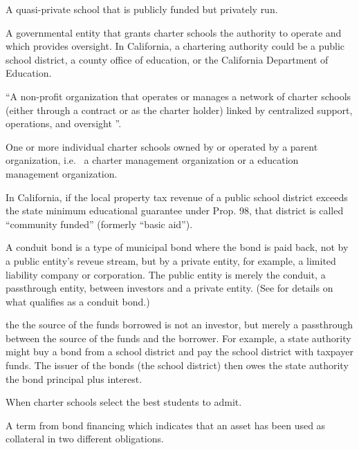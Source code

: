 \begin{description}[nosep]
\medskip\item[charter school] A quasi-private school that is publicly funded but privately run.

\medskip\item[chartering authority] A governmental entity that grants charter schools the authority to operate and which provides oversight. In California, a chartering authority could be a public school district, a county office of education, or the California Department of Education.

\medskip\item[charter management organization (CMO)] ``A non-profit organization that operates or manages a network of charter schools (either through a contract or as the charter holder) linked by centralized support, operations, and oversight \parencite{CDE2021b}''.

\medskip\item[charter school chain] One or more individual charter schools owned by or operated by a parent organization, i.e.  a charter management organization or a education management organization.

\medskip\item[community funded] In California, if the local property tax revenue of a public school district exceeds the state minimum educational guarantee under Prop. 98, that district is called ``community funded'' (formerly ``basic aid'').

\medskip\item[conduit bond] A conduit bond is a type of municipal bond where the bond is paid back, not by a public entity's reveue stream, but by a private entity, for example, a limited liability company or corporation. The public entity is merely the conduit, a passthrough entity, between investors and a private entity. (See  for details on what qualifies as a conduit bond.) %

the the source of the funds borrowed is not an investor, but merely a passthrough between the source of the funds and the borrower. For example, a state authority might buy a bond from a school district and pay the school district with taxpayer funds. The issuer of the bonds (the school district) then owes the state authority the bond principal plus interest.

\medskip\item[cream skimming] When charter schools select the best students to admit.

\medskip\item[cross-collateralization] A term from bond financing which indicates that an asset has been used as collateral in two different obligations.


\end{description}
